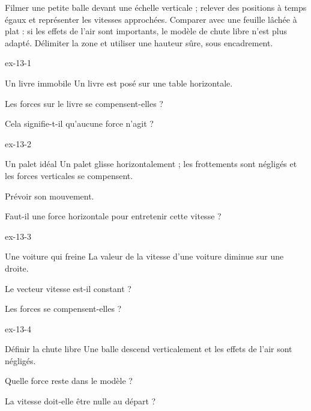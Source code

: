 \begin{experience}Filmer une petite balle devant une échelle verticale ; relever des positions à temps égaux et représenter les vitesses approchées. Comparer avec une feuille lâchée à plat : si les effets de l'air sont importants, le modèle de chute libre n'est plus adapté. Délimiter la zone et utiliser une hauteur sûre, sous encadrement.\end{experience}
\exercices
{}
\begin{blocLivre}{ex-13-1}\begin{exercice}[1]{Un livre immobile}
Un livre est posé sur une table horizontale.
\begin{questions}
\item Les forces sur le livre se compensent-elles ?
\item Cela signifie-t-il qu’aucune force n’agit ?
\end{questions}
\end{exercice}\end{blocLivre}
\begin{blocLivre}{ex-13-2}\begin{exercice}[1]{Un palet idéal}
Un palet glisse horizontalement ; les frottements sont négligés et les forces verticales se compensent.
\begin{questions}
\item Prévoir son mouvement.
\item Faut-il une force horizontale pour entretenir cette vitesse ?
\end{questions}
\end{exercice}\end{blocLivre}
\begin{blocLivre}{ex-13-3}\begin{exercice}[1]{Une voiture qui freine}
La valeur de la vitesse d’une voiture diminue sur une droite.
\begin{questions}
\item Le vecteur vitesse est-il constant ?
\item Les forces se compensent-elles ?
\end{questions}
\end{exercice}\end{blocLivre}
\begin{blocLivre}{ex-13-4}\begin{exercice}[1]{Définir la chute libre}
Une balle descend verticalement et les effets de l’air sont négligés.
\begin{questions}
\item Quelle force reste dans le modèle ?
\item La vitesse doit-elle être nulle au départ ?
\end{questions}
\end{exercice}\end{blocLivre}
